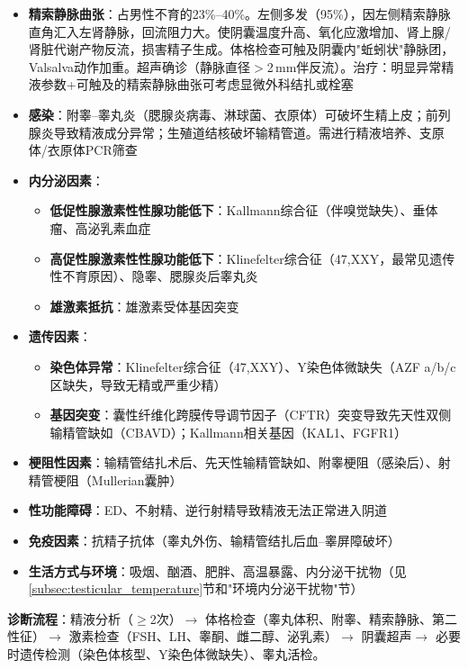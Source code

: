 \begin{itemize}[leftmargin=2cm]
	\item \textbf{精索静脉曲张}：占男性不育的23\%--40\%。左侧多发（95\%），因左侧精索静脉直角汇入左肾静脉，回流阻力大。使阴囊温度升高、氧化应激增加、肾上腺/肾脏代谢产物反流，损害精子生成。体格检查可触及阴囊内"蚯蚓状"静脉团，Valsalva动作加重。超声确诊（静脉直径$>$2\,mm伴反流）。治疗：明显异常精液参数+可触及的精索静脉曲张可考虑显微外科结扎或栓塞
	\item \textbf{感染}：附睾--睾丸炎（腮腺炎病毒、淋球菌、衣原体）可破坏生精上皮；前列腺炎导致精液成分异常；生殖道结核破坏输精管道。需进行精液培养、支原体/衣原体PCR筛查
	\item \textbf{内分泌因素}：
    \begin{itemize}
    	\item \textbf{低促性腺激素性性腺功能低下}：Kallmann综合征（伴嗅觉缺失）、垂体瘤、高泌乳素血症
    	\item \textbf{高促性腺激素性性腺功能低下}：Klinefelter综合征（47,XXY，最常见遗传性不育原因）、隐睾、腮腺炎后睾丸炎
    	\item \textbf{雄激素抵抗}：雄激素受体基因突变
    \end{itemize}
	\item \textbf{遗传因素}：
    \begin{itemize}
    	\item \textbf{染色体异常}：Klinefelter综合征（47,XXY）、Y染色体微缺失（AZF a/b/c区缺失，导致无精或严重少精）
    	\item \textbf{基因突变}：囊性纤维化跨膜传导调节因子（CFTR）突变导致先天性双侧输精管缺如（CBAVD）；Kallmann相关基因（KAL1、FGFR1）
    \end{itemize}
	\item \textbf{梗阻性因素}：输精管结扎术后、先天性输精管缺如、附睾梗阻（感染后）、射精管梗阻（Mullerian囊肿）
	\item \textbf{性功能障碍}：ED、不射精、逆行射精导致精液无法正常进入阴道
	\item \textbf{免疫因素}：抗精子抗体（睾丸外伤、输精管结扎后血--睾屏障破坏）
	\item \textbf{生活方式与环境}：吸烟、酗酒、肥胖、高温暴露、内分泌干扰物（见\ref{subsec:testicular_temperature}节和"环境内分泌干扰物"节）
\end{itemize}

\textbf{诊断流程}：精液分析（$\ge$2次）$\rightarrow$ 体格检查（睾丸体积、附睾、精索静脉、第二性征）$\rightarrow$ 激素检查（FSH、LH、睾酮、雌二醇、泌乳素）$\rightarrow$ 阴囊超声$\rightarrow$ 必要时遗传检测（染色体核型、Y染色体微缺失）、睾丸活检。

